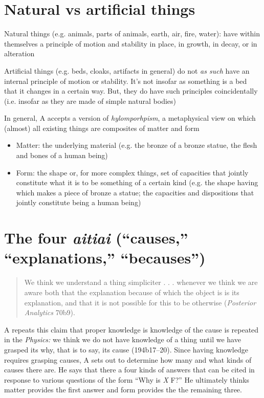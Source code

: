 \documentclass[oneside]{article}
\begin{document}
\thispagestyle{fancy}



\section*{Natural vs artificial things}

\noindent Natural things (e.g. animals, parts of animals, earth, air, fire, water): have within themselves a principle of motion and stability in place, in growth, in decay, or in alteration
\vspace*{2mm}

\noindent Artificial things (e.g. beds, cloaks, artifacts in general) do not \emph{as such} have an internal principle of motion or stability. It's not insofar as something is a bed that it changes in a certain way. But, they do have such principles coincidentally (i.e. insofar as they are made of simple natural bodies)
\vspace*{2mm}

\noindent In general, A accepts a version of \emph{hylomporhpism}, a metaphysical view on which (almost) all existing things are composites of matter and form
\begin{itemize}\item{Matter: the underlying material (e.g. the bronze of a bronze statue, the flesh and bones of a human being)}\item{Form: the shape or, for more complex things, set of capacities that jointly constitute what it is to be something of a certain kind (e.g. the shape having which makes a piece of bronze a statue; the capacities and dispositions that jointly constitute being a human being)}\end{itemize}

\section*{The four \emph{aitiai} (``causes,'' ``explanations,'' ``becauses'')}


\begin{quote}
We think we understand a thing simpliciter . . . whenever we think we are aware both that the explanation because of which the object is is its explanation, and that it is not possible for this to be otherwise (\emph{Posterior Analytics} 70b9).
\end{quote}
A repeats this claim that proper knowledge is knowledge of the cause is repeated in the \emph{Physics:} we think we do not have knowledge of a thing until we have grasped its why, that is to say, its cause (194b17--20). Since having knowledge requires grasping causes, A sets out to determine how many and what kinds of causes there are.
He says that there a four kinds of answers that can be cited in response to various questions of the form ``Why is \emph{X} F?'' He ultimately thinks matter provides the first answer and form provides the the remaining three.
\end{document}

